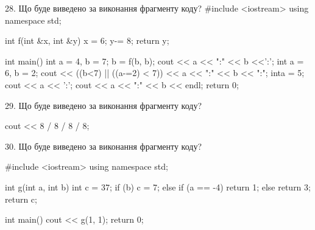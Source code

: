 \documentclass[11pt, ukrainian]{article}
\begin{document}
\begin{large}

28. Що буде виведено за виконання фрагменту коду?
#include <iostream>
using namespace std;

int f(int &x, int &y){
    x = 6;
    y-= 8;
    return y;
}

int main(){
    int a = 4, b = 7;
    b = f(b, b);
    cout << a << ":" << b <<':';
    {
        int a = 6, b = 2;
        cout << ((b<7) || ((a-=2) < 7))
             << a << ":" << b << ":";
    }
    {
        inta = 5;
        cout << a << ':';
    }
    cout << a << ":" << b << endl;
    return 0;
}



29. Що буде виведено за виконання фрагменту коду?

cout << 8 / 8 / 8 / 8;


30. Що буде виведено за виконання фрагменту коду?

#include <iostream>
using namespace std;

int g(int a, int b){
    int c = 37;
    if (b)
        c = 7;
    else if (a == -4)
         return 1;
    else 
        return 3;
    return c;
}

int main(){
    cout << g(1, 1);
    return 0;
}

\end{large}
\vspace{20mm}
\end{document}
